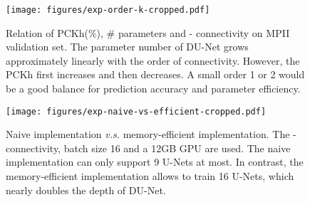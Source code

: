 \documentclass[runningheads]{llncs}
\begin{document}
\begin{figure}[t]
\centering
  \texttt{[image: figures/exp-order-k-cropped.pdf]}
\caption{Relation of PCKh(\%), \# parameters and - connectivity on MPII validation set. The parameter number of DU-Net grows approximately linearly with the order of connectivity. However, the PCKh first increases and then decreases. A small order 1 or 2 would be a good balance for prediction accuracy and parameter efficiency.}
\label{fig:exp-order-k}
\endminipage \hfill
{}
\centering
  \texttt{[image: figures/exp-naive-vs-efficient-cropped.pdf]}
\caption{Naive implementation {\it v.s.} memory-efficient implementation. The - connectivity, batch size 16 and a 12GB GPU are used. The naive implementation can only support 9 U-Nets at most. In contrast, the memory-efficient implementation allows to train 16 U-Nets, which nearly doubles the depth of DU-Net.}
  \label{fig:exp-naive-vs-efficient} \hfill
\endminipage
\end{figure}
\end{document}

